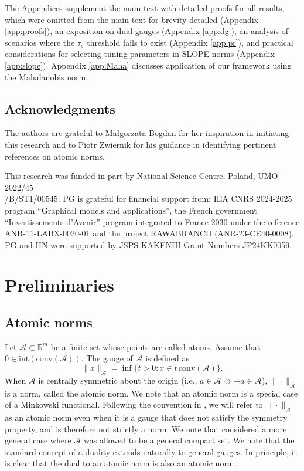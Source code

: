 \documentclass[12pt]{amsart}
\numberwithin{equation}{section}
\numberwithin{equation}{section}
\theoremstyle{definition}
\newcommand{\R}{\mathbb{R}}
\begin{document}
The Appendices supplement the main text with detailed proofs for all results, which were omitted from the main text for brevity detailed (Appendix \ref{app:proofs}), an exposition on dual gauges (Appendix \ref{app:dg}), an analysis of scenarios where the $\tau_\diamond$ threshold fails to exist (Appendix \ref{app:pr}), and practical considerations for selecting tuning parameters in SLOPE norms (Appendix \ref{app:slope}). Appendix \ref{app:Maha} discusses application of our framework using the Mahalanobis norm.

\subsection*{Acknowledgments}
The authors are grateful to Ma{\l}gorzata Bogdan for her inspiration in initiating this research and to Piotr Zwiernik for his guidance in identifying pertinent references on atomic norms.

This research was funded in part by National Science Centre, Poland, UMO-2022/45\\/B/ST1/00545.
 PG is grateful for financial support from: IEA CNRS 2024-2025 program ``Graphical models and applications'', 
the French government ``Investissements d’Avenir'' program integrated to France 2030 under the reference ANR-11-LABX-0020-01 and the project RAWABRANCH (ANR-23-CE40-0008). 
PG and HN were supported by 
JSPS KAKENHI Grant Numbers JP24KK0059.


\section{Preliminaries}\label{sec:preli}

\subsection{Atomic norms}\label{sec:atomic}

Let $\mathcal{A}\subset \R^m$ be a finite set whose points are called atoms. Assume that $0\in\mathrm{int}(\mathrm{conv}(\mathcal{A}))$. The gauge of $\mathcal{A}$ is defined as
\[
\|x\|_{\mathcal{A}} = \inf\{t>0\colon x\in t\,\mathrm{conv}(\mathcal{A})\}.
\]
When $\mathcal{A}$ is centrally symmetric about the origin (i.e., $a\in\mathcal{A}\iff-a\in\mathcal{A}$), $\|\cdot \|_{\mathcal{A}}$ is a norm, called the atomic norm.
We note that an atomic norm is a special case of a Minkowski functional.
Following the convention in \cite{Chandra12}, we will refer to $\|\cdot\|_{\mathcal{A}}$ as an atomic norm even when it is a gauge that does not satisfy the symmetry property, and is therefore not strictly a norm. We note that \cite{Chandra12} considered a more general case where $\mathcal{A}$ was allowed to be a general compact set. 
We note that the standard concept of a duality extends naturally to general gauges. In principle, it is clear that the dual to an atomic norm is also an atomic norm. 
\end{document}
